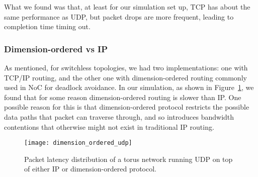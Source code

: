 What we found was that, at least for our simulation set up, TCP has about the same performance as UDP, but packet drops are more frequent, leading to completion time timing out.


\subsubsection{Dimension-ordered vs IP}
As mentioned, for switchless topologies, we had two implementations: one with TCP/IP routing, and the other one with dimension-ordered routing commonly used in NoC for deadlock avoidance. In our simulation, as shown in Figure~\ref{fig:dim_ordered}, we found that for some reason dimension-ordered routing is slower than IP. One possible reason for this is that dimension-ordered protocol restricts the possible data paths that packet can traverse through, and so introduces bandwidth contentions that otherwise might not exist in traditional IP routing.

\captionsetup[subfloat]{captionskip=-0.003in}
\begin{figure}
    \centering
    \texttt{[image: dimension\_ordered\_udp]}
    \caption{Packet latency distribution of a torus network running UDP on top of either IP or dimension-ordered protocol.}
    \label{fig:dim_ordered}
\end{figure}

